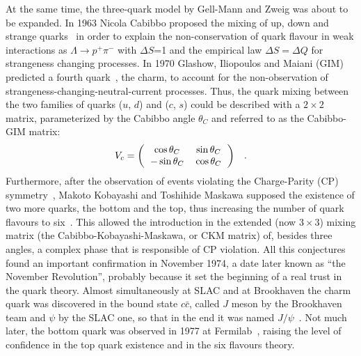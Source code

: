 At the same time, the three-quark model by Gell-Mann and Zweig was about to 
be expanded. In 1963 Nicola Cabibbo proposed the mixing of up, down and 
strange quarks~\cite{PhysRevLett.10.531} 
in order to explain the non-conservation of quark flavour 
in weak interactions as $\Lambda \rightarrow p^{+}\pi^{-}$ with $\Delta S$=1 
and the empirical law $\Delta S = \Delta Q$ for strangeness changing processes. 
In 1970 Glashow, Iliopoulos and Maiani (GIM) predicted a fourth quark~\cite{PhysRevD.2.1285}, 
the charm, to account for the non-observation of strangeness-changing-neutral-current 
processes. Thus, the quark mixing between the two families
of quarks ($u$, $d$) and ($c$, $s$) could be described with a $2\times 2$ 
matrix, parameterized by the Cabibbo angle $\theta_{C}$ and referred to as
 the Cabibbo-GIM matrix:
\begin{equation}\label{CabibboGIM}
V_{c} = {\setlength\arraycolsep{6pt}
\left( \begin{array}{cc}
\cos\theta_{C} & \sin\theta_{C}\\
-\sin\theta_{C}& \cos\theta_{C}
\end{array}
\right)} \quad .
\end{equation}
Furthermore, after the observation of events violating the Charge-Parity (CP) 
symmetry~\cite{PhysRevLett.13.286}, Makoto Kobayashi and 
Toshihide Maskawa supposed the 
existence of two more quarks, the bottom and the top, thus increasing 
the number of quark flavours to six~\cite{Kobayashi:1973fv}. 
This allowed the introduction in 
the extended (now $3\times 3$) mixing matrix (the Cabibbo-Kobayashi-Maskawa, or CKM matrix) 
of, besides three angles, a complex phase that is responsible of CP violation. 
All this conjectures found an important confirmation in November 1974, a date
later known as ``the November Revolution'', probably because it set the 
beginning of a real trust in the quark theory. 
Almost simultaneously at SLAC and at Brookhaven the charm quark was discovered 
in the bound state $c\bar c$, called $J$ meson by the Brookhaven team and 
$\psi$ by the SLAC one, so that in the end it was named $J/\psi$~\cite{PhysRevLett.33.1404,PhysRevLett.33.1406}. 
Not much later, the bottom quark was observed in 1977 at 
Fermilab~\cite{PhysRevLett.39.252}, 
raising the level of confidence in the top quark existence and in the six flavours theory.


